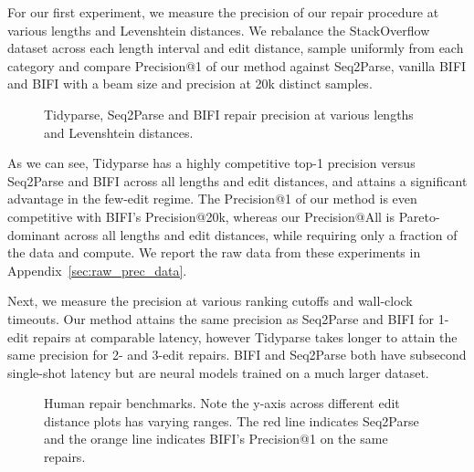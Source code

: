 \documentclass[sigplan,review,acmsmall,nonacm,anonymous]{acmart}\settopmatter{printfolios=false,printccs=false,printacmref=false}
\begin{document}
  For our first experiment, we measure the precision of our repair procedure at various lengths and Levenshtein distances. We rebalance the StackOverflow dataset across each length interval and edit distance, sample uniformly from each category and compare Precision@1 of our method against Seq2Parse, vanilla BIFI and BIFI with a beam size and precision at 20k distinct samples.

  \begin{figure}[h!]
    \resizebox{.24\textwidth}{!}{}
    \resizebox{.24\textwidth}{!}{}
    \resizebox{.24\textwidth}{!}{}
    \resizebox{.24\textwidth}{!}{}
    \caption{Tidyparse, Seq2Parse and BIFI repair precision at various lengths and Levenshtein distances.}\label{fig:len_dist_prec}
  \end{figure}

  As we can see, Tidyparse has a highly competitive top-1 precision versus Seq2Parse and BIFI across all lengths and edit distances, and attains a significant advantage in the few-edit regime. The Precision@1 of our method is even competitive with BIFI's Precision@20k, whereas our Precision@All is Pareto-dominant across all lengths and edit distances, while requiring only a fraction of the data and compute. We report the raw data from these experiments in Appendix~\ref{sec:raw_prec_data}.

  Next, we measure the precision at various ranking cutoffs and wall-clock timeouts. Our method attains the same precision as Seq2Parse and BIFI for 1-edit repairs at comparable latency, however Tidyparse takes longer to attain the same precision for 2- and 3-edit repairs. BIFI and Seq2Parse both have subsecond single-shot latency but are neural models trained on a much larger dataset.

  \begin{figure}[h!]
    \resizebox{.24\textwidth}{!}{}
    \resizebox{.24\textwidth}{!}{}
    \resizebox{.24\textwidth}{!}{}
    \resizebox{.24\textwidth}{!}{}
    \caption{Human repair benchmarks. Note the y-axis across different edit distance plots has varying ranges. The red line indicates Seq2Parse and the orange line indicates BIFI's Precision@1 on the same repairs.}\label{fig:human}
  \end{figure}
\end{document}
